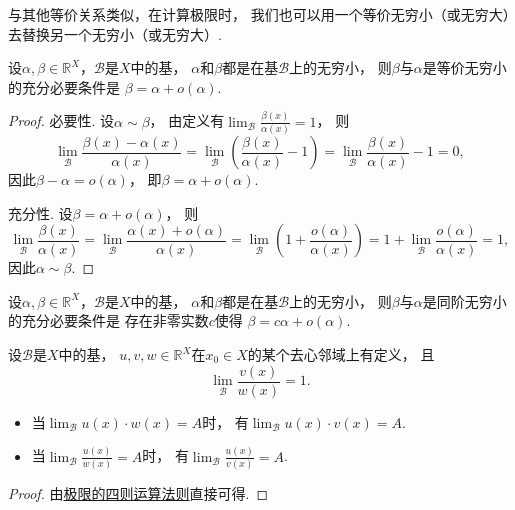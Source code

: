 与其他等价关系类似，在计算极限时，
我们也可以用一个等价无穷小（或无穷大）去替换另一个无穷小（或无穷大）.

\begin{theorem}\label{theorem:极限.无穷小的比较1}
设\(\alpha,\beta\in\mathbb{R}^X\)，\(\mathcal{B}\)是\(X\)中的基，
\(\alpha\)和\(\beta\)都是在基\(\mathcal{B}\)上的无穷小，
则\(\beta\)与\(\alpha\)是等价无穷小的充分必要条件是
\(\beta = \alpha + o(\alpha)\).
\begin{proof}
必要性.
设\(\alpha\sim\beta\)，
由定义有\(\lim_\mathcal{B} \frac{\beta(x)}{\alpha(x)} = 1\)，
则\[
	\lim_\mathcal{B} \frac{\beta(x)-\alpha(x)}{\alpha(x)}
	= \lim_\mathcal{B} \left(\frac{\beta(x)}{\alpha(x)}-1\right)
	= \lim_\mathcal{B} \frac{\beta(x)}{\alpha(x)}-1 = 0,
\]
因此\(\beta-\alpha=o(\alpha)\)，
即\(\beta=\alpha+o(\alpha)\).

充分性.
设\(\beta=\alpha+o(\alpha)\)，
则\[
	\lim_\mathcal{B} \frac{\beta(x)}{\alpha(x)}
	= \lim_\mathcal{B} \frac{\alpha(x)+o(\alpha)}{\alpha(x)}
	= \lim_\mathcal{B} \left(1+\frac{o(\alpha)}{\alpha(x)}\right)
	= 1 + \lim_\mathcal{B} \frac{o(\alpha)}{\alpha(x)}
	= 1,
\]
因此\(\alpha\sim\beta\).
\end{proof}
\end{theorem}
\begin{corollary}
设\(\alpha,\beta\in\mathbb{R}^X\)，\(\mathcal{B}\)是\(X\)中的基，
\(\alpha\)和\(\beta\)都是在基\(\mathcal{B}\)上的无穷小，
则\(\beta\)与\(\alpha\)是同阶无穷小的充分必要条件是
存在非零实数\(c\)使得
\(\beta = c \alpha + o(\alpha)\).
\end{corollary}

\begin{theorem}\label{theorem:极限.无穷小的比较2}
设\(\mathcal{B}\)是\(X\)中的基，
\(u,v,w\in\mathbb{R}^X\)在\(x_0 \in X\)的某个去心邻域上有定义，
且\[
	\lim_\mathcal{B} \frac{v(x)}{w(x)} = 1.
\]
\begin{itemize}
	\item 当\(\lim_\mathcal{B} u(x) \cdot w(x) = A\)时，
	有\(\lim_\mathcal{B} u(x) \cdot v(x) = A\).

	\item 当\(\lim_\mathcal{B} \frac{u(x)}{w(x)} = A\)时，
	有\(\lim_\mathcal{B} \frac{u(x)}{v(x)} = A\).
\end{itemize}
\begin{proof}
由\hyperref[theorem:极限.极限的四则运算法则]{极限的四则运算法则}直接可得.
\end{proof}
\end{theorem}

